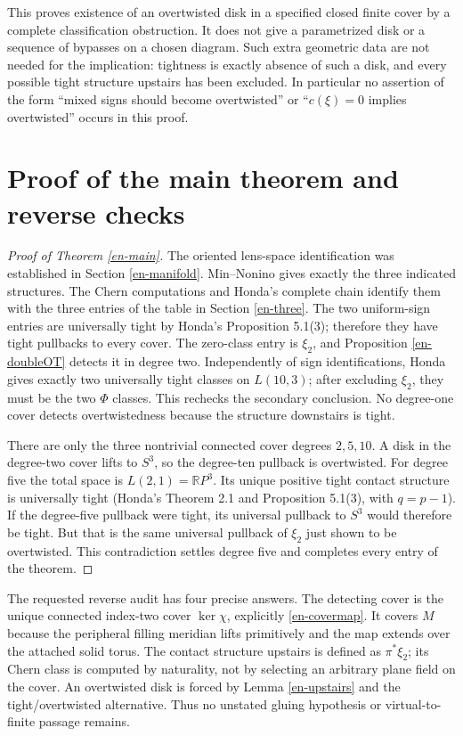 \documentclass[12pt]{amsart}
\theoremstyle{definition}
\theoremstyle{remark}
\numberwithin{equation}{section}
\newcommand{\R}{\mathbb{R}}
\theoremstyle{definition}
\begin{document}
This proves existence of an overtwisted disk in a specified closed finite cover by a complete classification obstruction. It does not give a parametrized disk or a sequence of bypasses on a chosen diagram. Such extra geometric data are not needed for the implication: tightness is exactly absence of such a disk, and every possible tight structure upstairs has been excluded. In particular no assertion of the form ``mixed signs should become overtwisted'' or ``$c(\xi)=0$ implies overtwisted'' occurs in this proof.

\section{Proof of the main theorem and reverse checks}\label{en-proof}
\begin{proof}[Proof of Theorem \ref{en-main}]
The oriented lens-space identification was established in Section \ref{en-manifold}. Min--Nonino gives exactly the three indicated structures. The Chern computations and Honda's complete chain identify them with the three entries of the table in Section \ref{en-three}. The two uniform-sign entries are universally tight by Honda's Proposition 5.1(3); therefore they have tight pullbacks to every cover. The zero-class entry is $\xi_2$, and Proposition \ref{en-doubleOT} detects it in degree two. Independently of sign identifications, Honda gives exactly two universally tight classes on $L(10,3)$; after excluding $\xi_2$, they must be the two $\Phi$ classes. This rechecks the secondary conclusion. No degree-one cover detects overtwistedness because the structure downstairs is tight.

There are only the three nontrivial connected cover degrees $2,5,10$. A disk in the degree-two cover lifts to $S^3$, so the degree-ten pullback is overtwisted. For degree five the total space is $L(2,1)=\R P^3$. Its unique positive tight contact structure is universally tight (Honda's Theorem 2.1 and Proposition 5.1(3), with $q=p-1$). If the degree-five pullback were tight, its universal pullback to $S^3$ would therefore be tight. But that is the same universal pullback of $\xi_2$ just shown to be overtwisted. This contradiction settles degree five and completes every entry of the theorem.
\end{proof}

The requested reverse audit has four precise answers. The detecting cover is the unique connected index-two cover $\ker\chi$, explicitly \eqref{en-covermap}. It covers $M$ because the peripheral filling meridian lifts primitively and the map extends over the attached solid torus. The contact structure upstairs is defined as $\pi^*\xi_2$; its Chern class is computed by naturality, not by selecting an arbitrary plane field on the cover. An overtwisted disk is forced by Lemma \ref{en-upstairs} and the tight/overtwisted alternative. Thus no unstated gluing hypothesis or virtual-to-finite passage remains.
\end{document}
